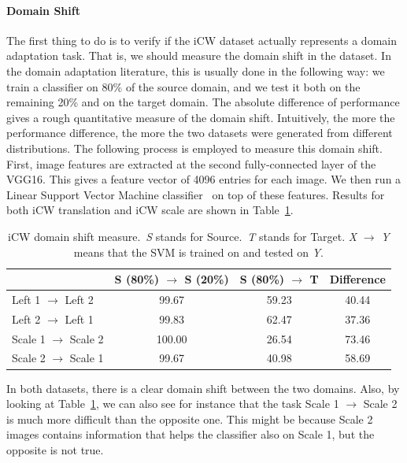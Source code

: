 \documentclass[../main.tex]{subfiles}
\begin{document}
    \paragraph{Domain Shift}
    The first thing to do is to verify if the iCW dataset actually represents a domain adaptation task. That is,
    we should measure the domain shift in the dataset. In the domain adaptation literature, this is usually
    done in the following way: we train a classifier on 80\% of the source domain, and we test it both on the
    remaining 20\% and on the target domain. The absolute difference of performance gives a
    rough quantitative measure of the domain shift. Intuitively, the more the performance difference,
    the more the two datasets were generated from different distributions. The following process is employed
    to measure this domain shift. First, image features are extracted at the second fully-connected layer of the
    VGG16. This gives a feature vector of 4096 entries for each image. We then run a Linear Support Vector Machine
    classifier~\cite{fan2008liblinear} on top of these features. Results for both iCW translation and iCW scale
	are shown in Table~\ref{table:domain-shift}.

	\begin{table}[!ht]
		\centering{}
		\begin{tabular}{l c c c}
			\toprule
                     & S (80\%) $\rightarrow$ S (20\%)  & S (80\%) $\rightarrow$ T & Difference \\
			\midrule
			Left 1 $\rightarrow$ Left 2   & 99.67  & 59.23 & 40.44 \\
			Left 2 $\rightarrow$ Left 1   & 99.83  & 62.47 & 37.36 \\
			Scale 1 $\rightarrow$ Scale 2 & 100.00 & 26.54 & 73.46 \\
			Scale 2 $\rightarrow$ Scale 1 & 99.67  & 40.98 & 58.69 \\

		\end{tabular}
		\caption{iCW domain shift measure.~\textit{S} stands for Source.~\textit{T} stands for Target. \textit{X} $\rightarrow$ \textit{Y} means that the SVM is trained on  and tested on \textit{Y}.}\label{table:domain-shift}
	\end{table}

	In both datasets, there is a clear domain shift between the two domains. Also, by looking at Table~\ref{table:domain-shift},
	we can also see for instance that the task Scale 1 $\rightarrow$ Scale 2 is much more difficult than the opposite one. This
	might be because Scale 2 images contains information that helps the classifier also on Scale 1, but the opposite is not true.
\end{document}
